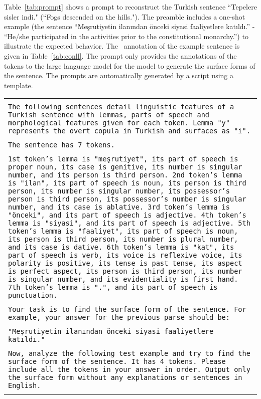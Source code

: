 Table~\ref{tab:prompt} shows a prompt to reconstruct the Turkish sentence ``Tepelere sisler indi." (``Fogs descended on the hills."). The preamble includes a one-shot example (the sentence ``Me\c{s}rutiyetin ilanından önceki siyasi faaliyetlere kat{\i}ld{\i}.'' - ``He/she participated in the activities prior to the constitutional monarchy.'') to illustrate the expected behavior. The \conllu\ annotation of the example sentence is given in Table~\ref{tab:conll}.
The prompt only provides the annotations of the tokens to the large language model for the model to generate the surface forms of the sentence. The prompts are automatically generated by a script using a template.

\begin{table*}
\begin{tabular}{| p{6in} |}
\hline
\\
\texttt{The following sentences detail linguistic features of a Turkish sentence with lemmas, parts of speech and morphological features given for each token. Lemma "y" represents the overt copula in Turkish and surfaces as "i".}\\\\[-1mm]
\texttt{The sentence has 7 tokens.}\\\\[-1mm]
\texttt{1st token's lemma is "meşrutiyet", its part of speech is proper noun, its case is genitive, its number is singular number, and its person is third person.
2nd token's lemma is "ilan", its part of speech is noun, its person is third person, its number is singular number, its possessor's person is third person, its possessor's number is singular number, and its case is ablative.
3rd token's lemma is "önceki", and its part of speech is adjective.
4th token's lemma is "siyasi", and its part of speech is adjective.
5th token's lemma is "faaliyet", its part of speech is noun, its person is third person, its number is plural number, and its case is dative.
6th token's lemma is "kat", its part of speech is verb, its voice is reflexive voice, its polarity is positive, its tense is past tense, its aspect is perfect aspect, its person is third person, its number is singular number, and its evidentiality is first hand.
7th token's lemma is ".", and its part of speech is punctuation.}\\\\[-1mm]

\texttt{Your task is to find the surface form of the sentence. For example, your answer for the previous parse should be:} \\\\[-1mm]
\texttt{"Meşrutiyetin ilanından önceki siyasi faaliyetlere katıldı."}\\\\[-1mm]
\texttt{Now, analyze the following test example and try to find the surface form of the sentence. It has 4 tokens. Please include all the tokens in your answer in order. Output only the surface form without any explanations or sentences in English.}\\\\[-1mm]


\end{tabular}
\end{table*}
